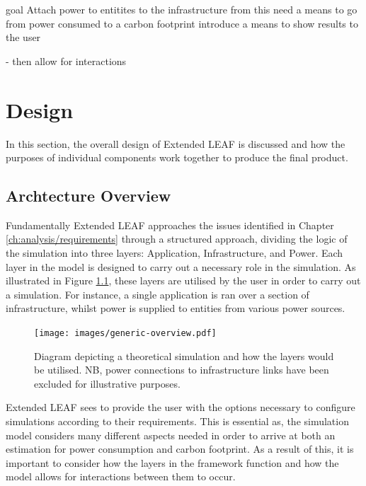 \documentclass{l4proj}
\begin{document}
goal Attach power to entitites to the infrastructure
from this need a means to go from power consumed to a carbon footprint
introduce a means to show results to the user

- then allow for interactions
\chapter{Design}\label{ch:design}

In this section, the overall design of Extended LEAF is discussed and how the purposes of individual components work together to produce the final product.


\section{Archtecture Overview}\label{sec:architecture-overview}
Fundamentally Extended LEAF approaches the issues identified in Chapter \ref{ch:analysis/requirements} through a structured approach, dividing the logic of the simulation into three layers: Application, Infrastructure, and Power.
Each layer in the model is designed to carry out a necessary role in the simulation.
As illustrated in Figure \ref{fig:generic-overview}, these layers are utilised by the user in order to carry out a simulation.
For instance, a single application is ran over a section of infrastructure, whilst power is supplied to entities from various power sources.

\begin{figure}[htbp]
    \centering
    \texttt{[image: images/generic-overview.pdf]}
    ~
    \caption{Diagram depicting a theoretical simulation and how the layers would be utilised. NB, power connections to infrastructure links have been excluded for illustrative purposes.}
    \label{fig:generic-overview}
\end{figure}

Extended LEAF sees to provide the user with the options necessary to configure simulations according to their requirements.
This is essential as, the simulation model considers many different aspects needed in order to arrive at both an estimation for power consumption and carbon footprint.
As a result of this, it is important to consider how the layers in the framework function and how the model allows for interactions between them to occur.
\end{document}
